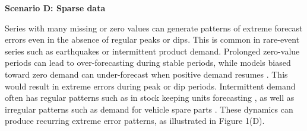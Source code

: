 \documentclass[]{interact}
\theoremstyle{definition}
\newenvironment{scenario}[1]{%
  \par\vspace{1ex}\noindent\textbf{#1}\par\vspace{0.5ex}}{\par}
\begin{document}

\begin{scenario}{Scenario D: Sparse data}

Series with many missing or zero values can generate patterns of extreme forecast errors even in the absence of regular peaks or dips. This is common in rare-event series %
such as earthquakes or intermittent product demand. Prolonged zero-value periods can lead to over-forecasting during stable periods, while models biased toward zero demand can under-forecast when positive demand resumes \citep{wang2024b}. This would result in extreme errors during peak or dip periods. Intermittent demand often has regular patterns such as in stock keeping units forecasting \citep{nikolopoulos2021}, as well as irregular patterns %
such as demand for vehicle spare parts \citep{jiang2021}. These dynamics can produce recurring extreme error patterns, as illustrated in Figure 1(D).
\end{scenario}
\end{document}
